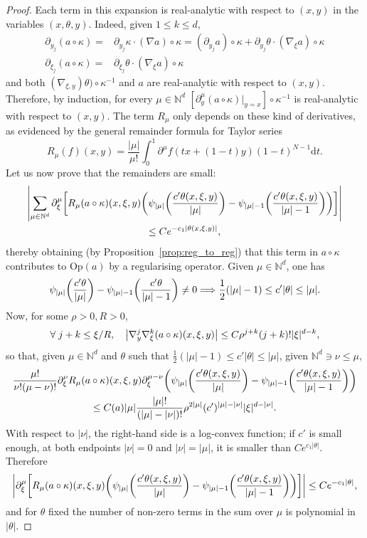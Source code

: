 \documentclass[10pt]{amsart}
\theoremstyle{definition}\newtheorem{defi}[theo]{Definition}\newtheorem{rema}[theo]{Remark}\newtheorem{exam}[theo]{Example}\newtheorem{exem}[theo]{Example}\newtheorem{nota}[theo]{Notation}
\newcommand{\Opp}{\mathrm{Op}}
\newcommand\1{\mathds{1}}
\newcommand{\N}{\mathbb{N}}
\newcommand{\dd}{\mathrm{d}}
\let\oldforall\forall
\renewcommand*{\forall}{\mathrel{\oldforall}}
\renewcommand*{\implies}{\mathchoice{\Longrightarrow}{\Rightarrow}{\Rightarrow}{\Rightarrow}}
\let\originalleft\left
\let\originalright\right
\renewcommand{\left}{\mathopen{}\mathclose\bgroup\originalleft}
\renewcommand{\right}{\aftergroup\egroup\originalright}
\begin{document}
\begin{proof}
Each term in this expansion is real-analytic with respect to $(x,y)$ in the variables $(x,\theta,y)$. Indeed, given $1\leq k\leq d$,
\begin{align*}
\partial_{y_j}(a\circ \kappa)=&\partial_{y_j}\kappa\cdot (\nabla a)\circ \kappa=(\partial_{y_j}a)\circ \kappa+\partial_{y_j}\theta\cdot (\nabla_{\xi}a)\circ \kappa\\
\partial_{\xi_j}(a\circ \kappa)=&\partial_{\xi_j}\theta\cdot (\nabla_{\xi} a)\circ \kappa
\end{align*}
and both $(\nabla_{\xi,y}) \theta)\circ \kappa^{-1}$ and $a$ are real-analytic with respect to $(x,y)$. Therefore, by induction, for every $\mu\in \N^{d}$ $[\partial_y^{\mu}(a\circ \kappa)|_{y=x}]\circ \kappa^{-1}$ is real-analytic with respect to $(x,y)$. The term $R_{\mu}$ only depends on these kind of derivatives, as evidenced by the general remainder formula for Taylor series
\[
R_{\mu}(f)(x,y)=\frac{|\mu|}{\mu!}\int_0^1\partial^{\mu}f(tx+(1-t)y)(1-t)^{N-1}\dd t.
\]
Let us now prove that the remainders are small:
\begin{multline*}
\left|\sum_{\mu\in
\N^d}\partial_{\xi}^{\mu}\left[R_{\mu}(a\circ
\kappa)(x,\xi,y)\left(\psi_{|\mu|}\left(\frac{c'\theta(x,\xi,y)}{|\mu|}\right)-\psi_{|\mu|-1}\left(\frac{c'\theta(x,\xi,y)}{|\mu|-1}
\right)\right)\right]\right|\\
\leq Ce^{-c_1|\theta(x,\xi,y)|},
\end{multline*}
thereby obtaining (by Proposition~\ref{prop:reg_to_reg}) that this term in $a\circ \kappa$ contributes to $\Opp(a)$ by a regularising operator. Given $\mu\in \N^d$, one has
\[
\psi_{|\mu|}\left(\frac{c'\theta}{|\mu|}\right)-\psi_{|\mu|-1}\left(\frac{c'\theta}{|\mu|-1}\right)\neq 0 \implies \frac 12 (|\mu|-1)\leq c'|\theta|\leq |\mu|.
\]
Now, for some $\rho>0,R>0$,
\[
\forall j+k\leq \xi/R,\quad \left|\nabla^j_y\nabla^k_{\xi}(a\circ \kappa)(x,\xi,y)\right|\leq C\rho^{j+k}(j+k)!|\xi|^{d-k},
\]
so that, given $\mu\in \N^d$ and $\theta$ such that $ \frac 12 (|\mu|-1)\leq c'|\theta|\leq |\mu|$, given $\N^{d}\ni \nu\leq
\mu$,
\begin{multline*}
\frac{\mu!}{\nu!(\mu-\nu)!}\partial_{\xi}^\nu R_{\mu}(a\circ
\kappa)(x,\xi,y)\partial_{\xi}^{\mu-\nu}\left(\psi_{|\mu|}
\left(\frac{c'\theta(x,\xi,y)}{|\mu|}\right)-\psi_{|\mu|-1}
\left(\frac{c'\theta(x,\xi,y)}{|\mu|-1}\right)\right)\\
\leq C(a)|\mu|\frac{|\mu|!}{(|\mu|-|\nu|)!}\rho^{2|\mu|}(c')^{|\mu|-|\nu|}|\xi|^{d-|\nu|}.
\end{multline*}
With respect to $|\nu|$, the right-hand side is a log-convex function; if $c'$ is small enough, at both endpoints $|\nu|=0$ and $|\nu|=|\mu|$, it is smaller than $Ce^{c_1|\theta|}$. Therefore
\[
\left|\partial_{\xi}^{\mu}\left[R_{\mu}(a\circ
\kappa)(x,\xi,y)\left(\psi_{|\mu|}\left(\frac{c'\theta(x,\xi,y)}{|\mu|}\right)-\psi_{|\mu|-1}\left(\frac{c'\theta(x,\xi,y)}{|\mu|-1}\right)\right)\right]\right|\leq Ce^{-c_1|\theta|},
\]
and for $\theta$ fixed the number of non-zero terms in the sum over $\mu$ is polynomial in $|\theta|$.


\end{proof}
\end{document}

